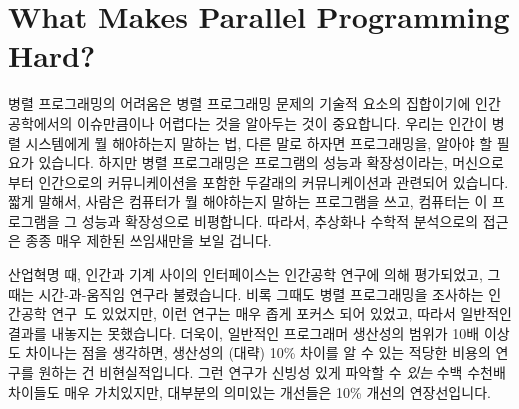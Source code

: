 \section{What Makes Parallel Programming Hard?}
\label{sec:intro:What Makes Parallel Programming Hard?}


병렬 프로그래밍의 어려움은 병렬 프로그래밍 문제의 기술적 요소의 집합이기에 인간
공학에서의 이슈만큼이나 어렵다는 것을 알아두는 것이 중요합니다.
우리는 인간이 병렬 시스템에게 뭘 해야하는지 말하는 법, 다른 말로 하자면
프로그래밍을, 알아야 할 필요가 있습니다.
하지만 병렬 프로그래밍은 프로그램의 성능과 확장성이라는, 머신으로부터
인간으로의 커뮤니케이션을 포함한 두갈래의 커뮤니케이션과 관련되어 있습니다.
짧게 말해서, 사람은 컴퓨터가 뭘 해야하는지 말하는 프로그램을 쓰고, 컴퓨터는 이
프로그램을 그 성능과 확장성으로 비평합니다.
따라서, 추상화나 수학적 분석으로의 접근은 종종 매우 제한된 쓰임새만을 보일
겁니다.

산업혁명 때, 인간과 기계 사이의 인터페이스는 인간공학 연구에 의해 평가되었고,
그때는 시간-과-움직임 연구라 불렸습니다.
비록 그때도 병렬 프로그래밍을 조사하는 인간공학
연구~\cite{RyanEccles2005HPCSNovice,RyanEccles2006HPCSNoviceNeeds,
LorinHochstein2005SC,DuaneSzafron1994PEMPDS}도
있었지만, 이런 연구는 매우 좁게 포커스 되어 있었고, 따라서 일반적인 결과를
내놓지는 못했습니다.
더욱이, 일반적인 프로그래머 생산성의 범위가 10배 이상도 차이나는 점을 생각하면,
생산성의 (대략) 10\% 차이를 알 수 있는 적당한 비용의 연구를 원하는 건
비현실적입니다.
그런 연구가 신빙성 있게 파악할 수 \emph{있는} 수백 수천배 차이들도 매우 가치있지만,
대부분의 의미있는 개선들은 10\% 개선의 연장선입니다.

